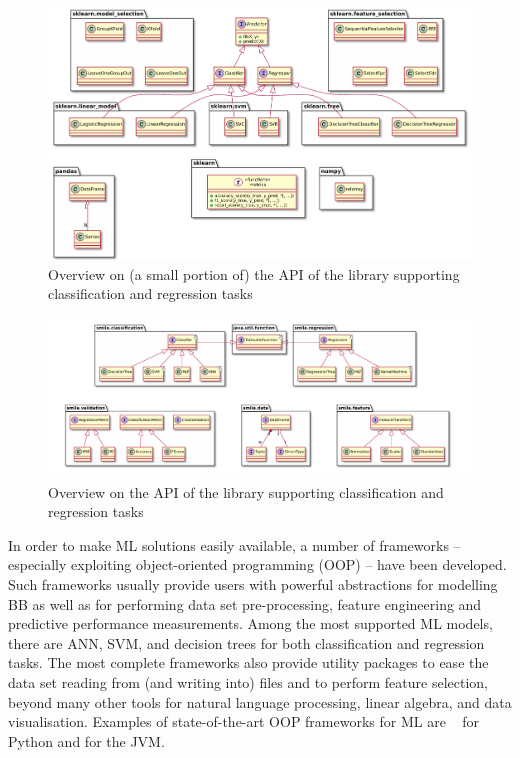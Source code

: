\documentclass[12pt,a4paper,openright,twoside]{book}
\begin{document}
\begin{figure}
    \includegraphics[width=\linewidth]{figures/scikit-simple.pdf}
    \caption{Overview on (a small portion of) the API of the \scikit{} library supporting classification and regression tasks}
    \label{fig:scikit}
\end{figure}

\begin{figure}
    \includegraphics[width=\linewidth]{figures/smile-simple.pdf}
    \caption{Overview on the API of the \smile{} library supporting classification and regression tasks}
    \label{fig:smile}
\end{figure}


In order to make ML solutions easily available, a number of frameworks -- especially exploiting object-oriented programming (OOP) -- have been developed.
%
Such frameworks usually provide users with powerful abstractions for modelling BB as well as for performing data set pre-processing, feature engineering and predictive performance measurements.
%
Among the most supported ML models, there are ANN, SVM, and decision trees for both classification and regression tasks.
%
The most complete frameworks also provide utility packages to ease the data set reading from (and writing into) files and to perform feature selection, beyond many other tools for natural language processing, linear algebra, and data visualisation.
%
Examples of state-of-the-art OOP frameworks for ML are \scikit{}~\cite{PedregosaVGMTGBPWDVPCBPD11} for Python and \smile{} \cite{SmileHomepage} for the JVM.
\end{document}
